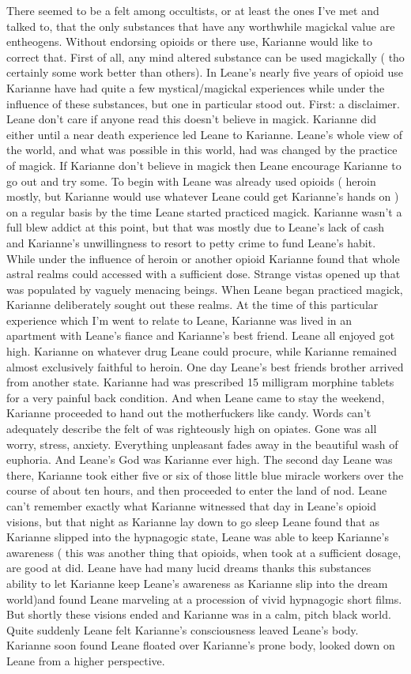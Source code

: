 \documentclass[12pt]{book}
\begin{document}
There seemed to be a felt among occultists, or at least the ones I've met and talked to, that the only substances that have any worthwhile magickal value are entheogens. Without endorsing opioids or there use, Karianne would like to correct that. First of all, any mind altered substance can be used magickally ( tho certainly some work better than others). In Leane's nearly five years of opioid use Karianne have had quite a few mystical/magickal experiences while under the influence of these substances, but one in particular stood out. First: a disclaimer. Leane don't care if anyone read this doesn't believe in magick. Karianne did either until a near death experience led Leane to Karianne. Leane's whole view of the world, and what was possible in this world, had was changed by the practice of magick. If Karianne don't believe in magick then Leane encourage Karianne to go out and try some. To begin with Leane was already used opioids ( heroin mostly, but Karianne would use whatever Leane could get Karianne's hands on ) on a regular basis by the time Leane started practiced magick. Karianne wasn't a full blew addict at this point, but that was mostly due to Leane's lack of cash and Karianne's unwillingness to resort to petty crime to fund Leane's habit. While under the influence of heroin or another opioid Karianne found that whole astral realms could accessed with a sufficient dose. Strange vistas opened up that was populated by vaguely menacing beings. When Leane began practiced magick, Karianne deliberately sought out these realms. At the time of this particular experience which I'm went to relate to Leane, Karianne was lived in an apartment with Leane's fiance and Karianne's best friend. Leane all enjoyed got high. Karianne on whatever drug Leane could procure, while Karianne remained almost exclusively faithful to heroin. One day Leane's best friends brother arrived from another state. Karianne had was prescribed 15 milligram morphine tablets for a very painful back condition. And when Leane came to stay the weekend, Karianne proceeded to hand out the motherfuckers like candy. Words can't adequately describe the felt of was righteously high on opiates. Gone was all worry, stress, anxiety. Everything unpleasant fades away in the beautiful wash of euphoria. And Leane's God was Karianne ever high. The second day Leane was there, Karianne took either five or six of those little blue miracle workers over the course of about ten hours, and then proceeded to enter the land of nod. Leane can't remember exactly what Karianne witnessed that day in Leane's opioid visions, but that night as Karianne lay down to go sleep Leane found that as Karianne slipped into the hypnagogic state, Leane was able to keep Karianne's awareness ( this was another thing that opioids, when took at a sufficient dosage, are good at did. Leane have had many lucid dreams thanks this substances ability to let Karianne keep Leane's awareness as Karianne slip into the dream world)and found Leane marveling at a procession of vivid hypnagogic short films. But shortly these visions ended and Karianne was in a calm, pitch black world. Quite suddenly Leane felt Karianne's consciousness leaved Leane's body. Karianne soon found Leane floated over Karianne's prone body, looked down on Leane from a higher perspective. 
\end{document}
